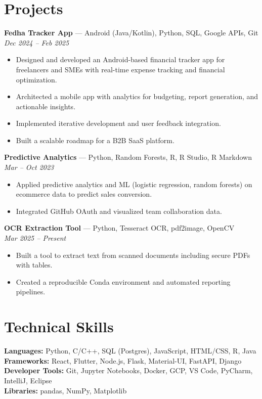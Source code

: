 \documentclass[11pt,a4paper]{article}
\begin{document}
\section*{Projects}
\textbf{Fedha Tracker App} — Android (Java/Kotlin), Python, SQL, Google APIs, Git \\
\textit{Dec 2024 – Feb 2025}
\begin{itemize}[leftmargin=*]
    \item Designed and developed an Android-based financial tracker app for freelancers and SMEs with real-time expense tracking and financial optimization.
    \item Architected a mobile app with analytics for budgeting, report generation, and actionable insights.
    \item Implemented iterative development and user feedback integration.
    \item Built a scalable roadmap for a B2B SaaS platform.
\end{itemize}

\textbf{Predictive Analytics} — Python, Random Forests, R, R Studio, R Markdown \\
\textit{Mar – Oct 2023}
\begin{itemize}[leftmargin=*]
    \item Applied predictive analytics and ML (logistic regression, random forests) on ecommerce data to predict sales conversion.
    \item Integrated GitHub OAuth and visualized team collaboration data.
\end{itemize}

\textbf{OCR Extraction Tool} — Python, Tesseract OCR, pdf2image, OpenCV \\
\textit{Mar 2025 – Present}
\begin{itemize}[leftmargin=*]
    \item Built a tool to extract text from scanned documents including secure PDFs with tables.
    \item Created a reproducible Conda environment and automated reporting pipelines.
\end{itemize}

\section*{Technical Skills}
\textbf{Languages:} Python, C/C++, SQL (Postgres), JavaScript, HTML/CSS, R, Java \\
\textbf{Frameworks:} React, Flutter, Node.js, Flask, Material-UI, FastAPI, Django \\
\textbf{Developer Tools:} Git, Jupyter Notebooks, Docker, GCP, VS Code, PyCharm, IntelliJ, Eclipse \\
\textbf{Libraries:} pandas, NumPy, Matplotlib
\end{document}
